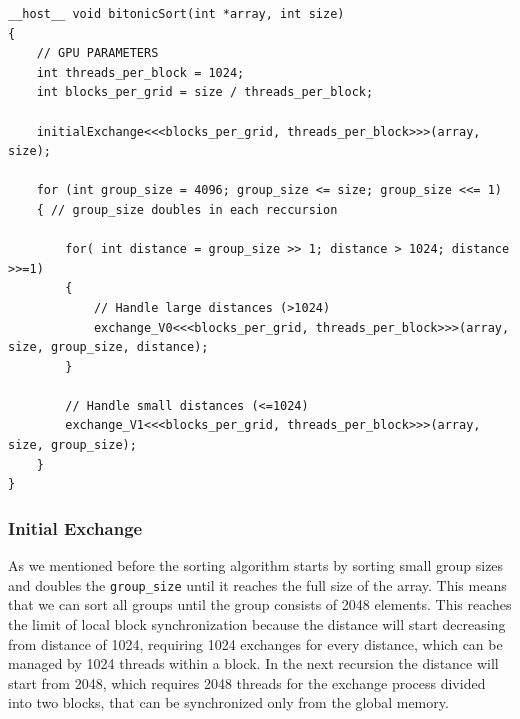 \documentclass[a4paper,12pt]{article}
\begin{document}
\begin{lstlisting}[caption={Bitonic Sort algorithm of V1}, label={lst:bitSort1}]
    __host__ void bitonicSort(int *array, int size)
{
    // GPU PARAMETERS
    int threads_per_block = 1024;
    int blocks_per_grid = size / threads_per_block;

    initialExchange<<<blocks_per_grid, threads_per_block>>>(array, size);

    for (int group_size = 4096; group_size <= size; group_size <<= 1)
    { // group_size doubles in each reccursion

        for( int distance = group_size >> 1; distance > 1024; distance >>=1)
        {
            // Handle large distances (>1024)
            exchange_V0<<<blocks_per_grid, threads_per_block>>>(array, size, group_size, distance);
        }

        // Handle small distances (<=1024)
        exchange_V1<<<blocks_per_grid, threads_per_block>>>(array, size, group_size);
    }
}
\end{lstlisting}

\subsubsection*{Initial Exchange}
As we mentioned before the sorting algorithm starts by sorting small group sizes and doubles the \texttt{group\_size} until it reaches the full size of the array. This means that we can sort all groups until the group consists of 2048 elements. This reaches the limit of local block synchronization because the distance will start decreasing from distance of 1024, requiring 1024 exchanges for every distance, which can be managed by 1024 threads within a block. In the next recursion the distance will start from 2048, which requires 2048 threads for the exchange process divided into two blocks, that can be synchronized only from the global memory.
\end{document}
